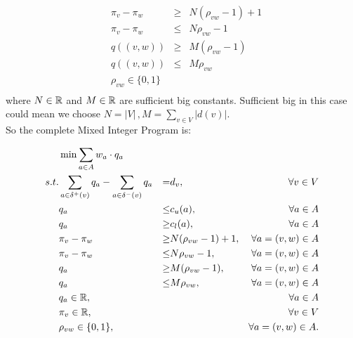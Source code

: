 \begin{align*}
 &\pi_v-\pi_w &\ge & N(\rho_{vw}-1)+1\\
 &\pi_v-\pi_w&\le &N\rho_{vw}-1 \\
 &q((v,w))&\ge& M(\rho_{vw}-1)\\
 &q((v,w))&\le & M\rho_{vw}\\
 &\rho_{vw} \in \{0,1\}&&\\
\end{align*}
where $N\in \mathbb{R}$ and $M\in \mathbb{R}$ are sufficient big constants. Sufficient big in this case could mean we choose 
$N=|V|\, ,M=\sum_{v\in V}|d(v)|$. \\
So the complete Mixed Integer Program is:

\begin{align*}
  &\min \sum_{a\in A} w_a\cdot q_a & \\
 s.t. & \sum_{a\in \delta^+(v)}q_a - \sum_{a\in\delta^- (v)}q_a &=& d_v,\, &\forall v\in V \\
 & q_a &\le& c_u(a), & \forall a\in A\\
 & q_a &\ge& c_l(a), & \forall a\in A\\
 & \pi_v-\pi_w &\ge & N(\rho_{vw}-1)+1,& \forall a=(v,w)\in A\\
 & \pi_v-\pi_w&\le &N\rho_{vw}-1,& \forall a=(v,w)\in A\\
 & q_a&\ge& M(\rho_{vw}-1),& \forall a=(v,w)\in A\\
 & q_a&\le & M\rho_{vw},& \forall a=(v,w)\in A\\
 & q_a \in \mathbb{R}, & & &\forall a\in A\\
 & \pi_v \in \mathbb{R}, & & & \forall v\in V\\
 & \rho_{vw} \in \{0,1\},&&& \forall a=(v,w)\in A.\\
\end{align*}

